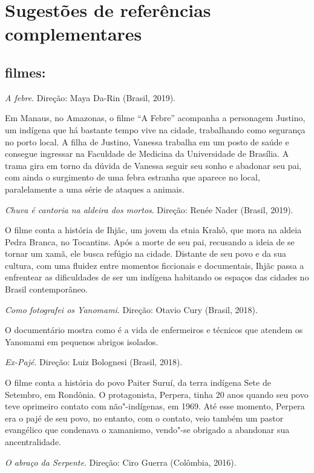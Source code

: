 \documentclass[12pt]{extarticle}
\begin{document}
\section{Sugestões de referências complementares}\label{sugestoes}

\subsection{filmes:}

\textit{A febre}. Direção: Maya Da-Rin (Brasil, 2019).

Em Manaus, no Amazonas, o filme ``A Febre'' acompanha a personagem Justino, um
indígena que há bastante tempo vive na cidade, trabalhando como segurança no 
porto local. A filha de Justino, Vanessa trabalha em um posto de saúde e consegue 
ingressar na Faculdade de Medicina da Universidade de Brasília. 
A trama gira em torno da dúvida de Vanessa seguir seu sonho e abadonar seu pai, com 
ainda o surgimento de uma febra estranha que aparece no local, paralelamente a uma 
série de ataques a animais.

\textit{Chuva é cantoria na aldeira dos mortos}. Direção: Renée Nader (Brasil, 2019).

O filme conta a história de Ihjãc, um jovem da etnia Krahô, que mora na aldeia Pedra 
Branca, no Tocantins. Após a morte de seu pai, recusando a ideia de se tornar um xamã, 
ele busca refúgio na cidade. Distante de seu povo e da sua cultura, com uma fluidez 
entre momentos ficcionais e documentais, Ihjãc passa a enfrentear as dificuldades de 
ser um indígena habitando os espaços das cidades no Brasil contemporâneo.

\textit{Como fotografei os Yanomami}. Direção: Otavio Cury (Brasil,
2018).

O documentário mostra como é a vida de enfermeiros e técnicos que
atendem os Yanomami em pequenos abrigos isolados.

\textit{Ex-Pajé}. Direção: Luiz Bolognesi (Brasil, 2018).

O filme conta a história do povo Paiter Suruí, da terra indígena Sete de 
Setembro, em Rondônia. O protagonista, Perpera, tinha 20 anos quando seu povo 
teve oprimeiro contato com não"-indígenas, em 1969. Até esse momento, Perpera 
era o pajé de seu povo, no entanto, com o contato, veio também um pastor 
evangélico que condenava o xamanismo, vendo"-se obrigado a abandonar sua ancentralidade.

\textit{O abraço da Serpente}. Direção: Ciro Guerra (Colômbia, 2016).
\end{document}
